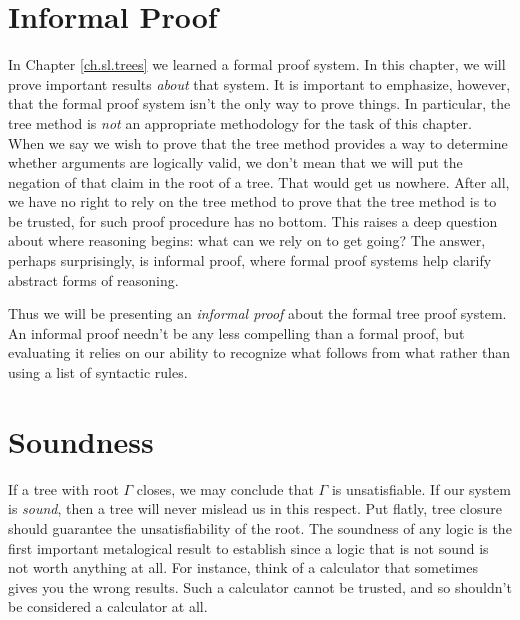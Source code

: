 \section{Informal Proof}

In Chapter \ref{ch.sl.trees} we learned a formal proof system.
In this chapter, we will prove important results \emph{about} that system.
It is important to emphasize, however, that the formal proof system isn't the only way to prove things.
In particular, the tree method is \emph{not} an appropriate methodology for the task of this chapter.
When we say we wish to prove that the tree method provides a way to determine whether arguments are logically valid, we don't mean that we will put the negation of that claim in the root of a tree.
That would get us nowhere.
After all, we have no right to rely on the tree method to prove that the tree method is to be trusted, for such proof procedure has no bottom.
This raises a deep question about where reasoning begins: what can we rely on to get going?
The answer, perhaps surprisingly, is informal proof, where formal proof systems help clarify abstract forms of reasoning.

Thus we will be presenting an \emph{informal proof} about the formal tree proof system.
An informal proof needn't be any less compelling than a formal proof, but evaluating it relies on our ability to recognize what follows from what rather than using a list of syntactic rules.





\section{Soundness}

If a tree with root $\Gamma$ closes, we may conclude that $\Gamma$ is unsatisfiable.
If our system is \textit{sound}, then a tree will never mislead us in this respect.
Put flatly, tree closure should guarantee the unsatisfiability of the root.
The soundness of any logic is the first important metalogical result to establish since a logic that is not sound is not worth anything at all.
For instance, think of a calculator that sometimes gives you the wrong results.
Such a calculator cannot be trusted, and so shouldn't be considered a calculator at all.

\label{definesound}

